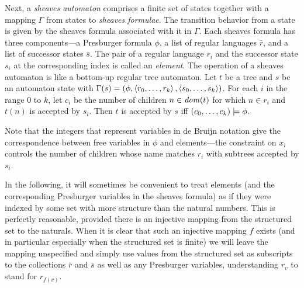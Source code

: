 Next, a {\em sheaves automaton} comprises a finite set of states together
with a mapping \(\Gamma\)
from states to \emph{sheaves formulae}. The transition behavior from a
state is given by the sheaves formula{} associated with it in
\(\Gamma\). Each sheaves formula has three components---a Presburger formula
$\phi$, a list of regular languages $\bar r$, and a list of successor states
$\bar s$. The pair of a regular language $r_i$ and the successor state $s_i$
at the corresponding index is called an \emph{element}. The operation of a
sheaves automaton is like a bottom-up regular tree automaton. Let \(t\) be a
tree and \(s\) be an automaton state with \(\Gamma(s) =
(\phi, \left<r_0,\ldots,r_k\right>, \left<s_0,\ldots,s_k\right>)\). For
each \(i\) in the range \(0\) to \(k\), let \(c_i\) be the number of
children \(n \in \mathit{dom}(t)\) for which \(n \in r_i\) and \(t(n)\) is
accepted by \(s_i\). Then \(t\) is accepted by \(s\) iff
\((c_0,\dots,c_k) \models \phi\).

Note that the integers that represent variables in de Bruijn notation
give the correspondence between free variables in \(\phi\) and
elements---the constraint on \(x_i\) controls the number of children
whose name matches \(r_i\) with subtrees accepted by \(s_i\).

In the following, it will sometimes be convenient to treat elements (and the
corresponding Presburger variables in the sheaves formula) as if they were
indexed by some set with more structure than the natural numbers.  This is
perfectly reasonable, provided there is an injective mapping from the
structured set to the naturals. When it is clear that such an injective
mapping $f$ exists (and in particular especially when the structured set is
finite) we will leave the mapping unspecified and simply use values from the
structured set as subscripts to the collections $\bar r$ and $\bar s$ as
well as any Presburger variables, understanding $r_{v}$ to stand for
$r_{f(v)}$.

